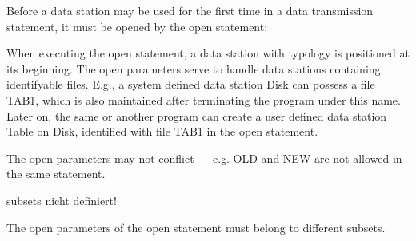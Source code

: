 Before a data station may be used for the first time in a data
transmission statement, it must be opened by the open statement:



When executing the open statement, a data station with typology is
positioned at its beginning.
The open parameters serve to handle data stations containing
identifyable files. E.g., a system defined data station Disk can possess
a file TAB1, which is also maintained after terminating the program
under this name. Later on, the same or another program can create a user
defined data station Table on Disk, identified with file TAB1 in the
open statement.




The open parameters may not conflict --- e.g. OLD and NEW are not allowed
in the same statement.

\begin{discuss}
subsets nicht definiert!


The open parameters of the open statement must belong to different
subsets.
\end{discuss}

